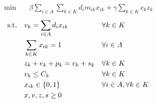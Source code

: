 \begin{align}
    \min\quad       & \beta \sum_{i \in A} \sum_{k \in K}{d_{i} m_{ik} x_{ik}} + \gamma \sum_{k \in K}{c_k z_k}
    \label{eq:singolo-obj}
\end{align}
\vspace*{-6mm}
\begin{align}
    \text{s.t.\quad}
    \label{eq:singolo-c1}
    & v_k = \sum_{i \in A}{d_i x_{ik}}              &   & \forall k \in K                  \\
    \label{eq:singolo-c2}
    & \sum_{k \in K}{x_{ik}} = 1                    &   & \forall i \in A                  \\
    \label{eq:singolo-c3}
    & z_k + e_k + p_k = v_k + s_k                   &   & \forall k \in K                  \\
    \label{eq:singolo-c4}
    & v_k \leq C_k                                  &   & \forall k \in K                  \\
    \label{eq:singolo-c5}
    & x_{ik} \in \{0,1\}                            &   & \forall i \in A, \forall k \in K \\
    \label{eq:singolo-c6}
    & x, v, z, s \geq 0                          &   &
\end{align}
